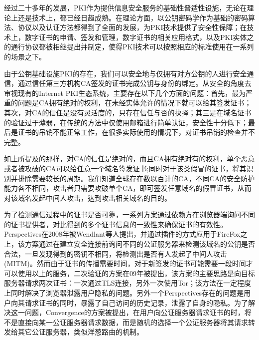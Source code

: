经过二十多年的发展，PKI作为提供信息安全服务的基础性普适性设施，无论在理论上还是技术上，都已经日趋成熟。在理论方面，以公钥密码学作为基础的密码算法、协议以及认证方法都得到了全面的发展，为PKI技术提供了安全性保障；在技术上，数字证书的申请、签发和管理，数字证书的相关应用格式，以及PKI实体之的通行协议都被相继提出并制定，使得PKI技术可以按照相应的标准使用在一系列的场景之下。


由于公钥基础设施PKI的存在，我们可以安全地与仅拥有对方公钥的人进行安全通信，通过信任第三方机构CA签发的证书完成公钥与身份的绑定。从安全的角度去审视现有的Internet PKI生态系统，主要存在以下几个方面的问题：首先，最为严重的问题是CA拥有绝对的权利，在未经实体允许的情况下就可以给其签发证书；其次，对CA的信任是没有灵活度的，只存在信任与否的抉择；其三是在域名证书的验证过于薄弱，在传统的方法中仅使用邮箱进行简单认证，安全性十分低下；最后是证书的吊销不能正常工作，在很多实际使用的情况下，对证书吊销的检查并不完整\cite{ristic2014bulletproof}。

如上所提及的那样，对CA的信任是绝对的，而且CA拥有绝对有的权利，单个恶意或者被攻破的CA可以给任意一个域名签发证书\cite{ducklin2013turktrust};同时对于该类假冒的证书，将其识别并排除需要较长的周期。我们知道全球存在数以百计的CA，不同CA的安全防护能力各不相同，攻击者只需要攻破单个CA，即可签发任意域名的假冒证书，从而对该域名发起中间人攻击，达到攻击相关域名的目的。





为了检测通信过程中的证书是否可靠，一系列方案通过依赖方在浏览器端询问不同的证书提供者，对比得到的多个证书信息的一致性来确保证书的有效性。Perspectives\cite{wendlandt2008perspectives}在2008年被Wendlant等人提出，并通过插件的方式应用于FireFox之上，该方案通过在建立安全连接前询问不同的公证服务器来检测该域名的公钥是否合法，一旦发现得到的密钥不相同，将检测出是否有人发起了中间人攻击(MITM)。然而由于证书的传播需要时间，对于新签发的证书可能需要一段时间才可以使用以上的服务，二次验证\cite{alicherry2009doublecheck}的方案在09年被提出，该方案的主要思路是向目标服务器请求两次证书：一次通过TLS连接，另外一次使用Tor\cite{alicherry2009doublecheck}；该方法在一定程度上同时解决了浏览器泄露用户隐私的问题。另外一个Perspectives存在的问题是用户向其请求证书的同时，暴露了自己访问的历史记录，泄露了自身的隐私。为了解决这一问题，Convergence\cite{convergence}的方案被提出，在用户向公证服务器请求证书的时，将不是直接向某一公证服务器请求数据，而是随机的选择一个公证服务器将其请求转发给其它公证服务器，类似洋葱路由的机制。

